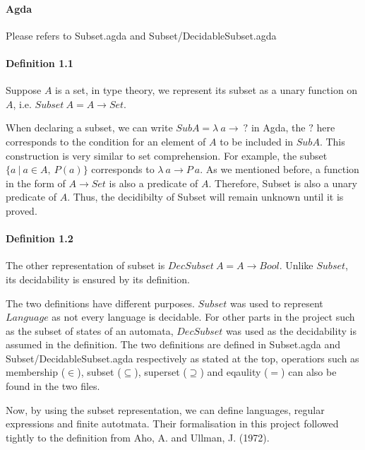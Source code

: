 \documentclass[twoside,openright,final]{bhamthesis}
\begin{document}
\paragraph{Agda} Please refers to Subset.agda and Subset/DecidableSubset.agda

\paragraph{Definition 1.1} Suppose \(A\) is a set, in type theory, we represent its subset as a unary function on
\(A\), i.e. \(Subset\ A = A \to Set\). \\

\par When declaring a subset, we can write \(SubA =
\lambda\ a \to\ ?\) in Agda, the \(?\) here corresponds to the
condition for an element of \(A\) to be included in \(SubA\). This construction is
very similar to set comprehension. For example, the subset 
\(\{a\ | \ a \in A,\ P(a)\}\) corresponds to \(\lambda\ a \to P\
a\). As we mentioned before, a function in the form of \(A \to
Set\) is also a predicate of \(A\). Therefore, Subset is also a unary
predicate of \(A\). Thus, the decidibilty of Subset will remain
unknown until it is proved. 

\paragraph{Definition 1.2} The other representation of subset is \(DecSubset\ A = A \to
Bool\). Unlike \(Subset\), its decidability is ensured by its
definition. \\

\par The two definitions have different purposes. \(Subset\) was used to represent \(Language\) as not every
language is decidable. For other parts in the project 
such as the subset of states of an automata, \(DecSubset\) was used
as the decidability is assumed in the definition. The two definitions
are defined in Subset.agda and Subset/DecidableSubset.agda
respectively as stated at the top, operatiors such as membership (\(\in\)), subset
(\(\subseteq\)), superset (\(\supseteq\)) and eqaulity (\(=\)) can
also be found in the two files. 

\par Now, by using the subset representation, we can define languages, regular expressions and finite
autotmata. Their formalisation in this project followed tightly to the
definition from Aho, A. and Ullman, J. (1972). 
\end{document}
